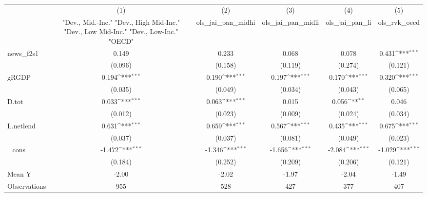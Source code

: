 {
\def\sym#1{\ifmmode^{#1}\else\(^{#1}\)\fi}
\begin{tabular}{l*{5}{c}}
\toprule
            &\multicolumn{1}{c}{(1)}&\multicolumn{1}{c}{(2)}&\multicolumn{1}{c}{(3)}&\multicolumn{1}{c}{(4)}&\multicolumn{1}{c}{(5)}\\
            &\multicolumn{1}{c}{ "Dev., Mid.-Inc." "Dev., High Mid-Inc." "Dev., Low Mid-Inc." "Dev., Low-Inc." "OECD" }&\multicolumn{1}{c}{ols\_jai\_pan\_midhi}&\multicolumn{1}{c}{ols\_jai\_pan\_midli}&\multicolumn{1}{c}{ols\_jai\_pan\_li}&\multicolumn{1}{c}{ols\_rvk\_oecd}\\
\midrule
news\_f2s1   &       0.149         &       0.233         &       0.068         &       0.078         &       0.431\sym{***}\\
            &     (0.096)         &     (0.158)         &     (0.119)         &     (0.274)         &     (0.121)         \\
\addlinespace
gRGDP       &       0.194\sym{***}&       0.190\sym{***}&       0.197\sym{***}&       0.170\sym{***}&       0.320\sym{***}\\
            &     (0.035)         &     (0.049)         &     (0.034)         &     (0.043)         &     (0.065)         \\
\addlinespace
D.tot       &       0.033\sym{***}&       0.063\sym{***}&       0.015         &       0.056\sym{**} &       0.046         \\
            &     (0.012)         &     (0.023)         &     (0.009)         &     (0.024)         &     (0.034)         \\
\addlinespace
L.netlend   &       0.631\sym{***}&       0.659\sym{***}&       0.567\sym{***}&       0.435\sym{***}&       0.675\sym{***}\\
            &     (0.037)         &     (0.037)         &     (0.081)         &     (0.049)         &     (0.023)         \\
\addlinespace
\_cons      &      -1.472\sym{***}&      -1.346\sym{***}&      -1.656\sym{***}&      -2.084\sym{***}&      -1.029\sym{***}\\
            &     (0.184)         &     (0.252)         &     (0.209)         &     (0.206)         &     (0.121)         \\
\midrule
Mean Y      &       -2.00         &       -2.02         &       -1.97         &       -2.04         &       -1.49         \\
Observations&         955         &         528         &         427         &         377         &         407         \\
\bottomrule
\end{tabular}
}
